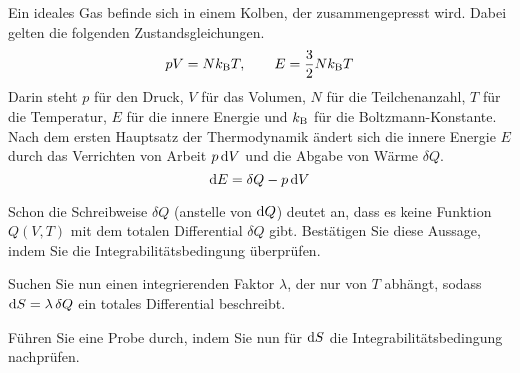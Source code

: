 \begin{atiTask}[
  title = Ideales Gas
]
  Ein ideales Gas befinde sich in einem Kolben, der zusammengepresst wird.
  Dabei gelten die folgenden Zustandsgleichungen.
  \[
    pV = Nk_{\mathrm{B}}T ,\qquad E = \frac{3}{2}Nk_{\mathrm{B}}T
  \]
  Darin steht $p$ für den Druck, $V$ für das Volumen, $N$ für die Teilchenanzahl, $T$ für die Temperatur, $E$ für die innere Energie und $k_{\mathrm{B}}$ für die Boltzmann-Konstante.
  Nach dem ersten Hauptsatz der Thermodynamik ändert sich die innere Energie $E$ durch das Verrichten von Arbeit $p\,\mathrm{d} V$ und die Abgabe von Wärme $\delta Q$.
  \[
    \mathrm{d} E = \delta Q - p\,\mathrm{d} V
  \]
  \begin{atiSubtasks}
    \item{
      Schon die Schreibweise $\delta Q$ (anstelle von $\mathrm{d} Q$) deutet an, dass es keine Funktion $Q(V,T)$ mit dem totalen Differential $\delta Q$ gibt.
      Bestätigen Sie diese Aussage, indem Sie die Integrabilitätsbedingung überprüfen.
    }
    \item{
      Suchen Sie nun einen integrierenden Faktor $\lambda$, der nur von $T$ abhängt, sodass $\mathrm{d} S = \lambda\,\delta Q$ ein totales Differential beschreibt.
    }
    \item{
      Führen Sie eine Probe durch, indem Sie nun für $\mathrm{d} S$ die Integrabilitätsbedingung nachprüfen.
    }
  \end{atiSubtasks}
\end{atiTask}